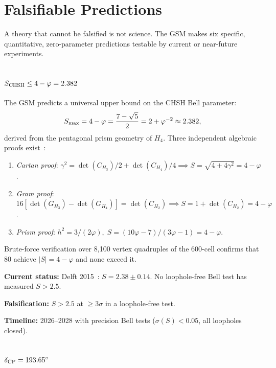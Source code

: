 \documentclass[aps,prd,twocolumn,superscriptaddress,nofootinbib,showpacs]{revtex4-2}
\begin{document}
\section{Falsifiable Predictions}\label{sec:predictions}

A theory that cannot be falsified is not science.  The GSM makes six
specific, quantitative, zero-parameter predictions testable by
current or near-future experiments.

\subsection{$S_{\rm CHSH} \leq 4 - \varphi = 2.382$}
\label{sec:bell}

The GSM predicts a universal upper bound on the CHSH Bell parameter:
\begin{equation}
S_{\rm max} = 4 - \varphi = \frac{7 - \sqrt{5}}{2} = 2 + \varphi^{-2}
\approx 2.382,
\label{eq:chsh}
\end{equation}
derived from the pentagonal prism geometry of $H_4$.  Three
independent algebraic proofs exist~\cite{GSMrepo}:
\begin{enumerate}
\item \emph{Cartan proof}: $\gamma^2 = \det(C_{H_3})/2 +
\det(C_{H_4})/4 \implies S = \sqrt{4 + 4\gamma^2} = 4 - \varphi$.
\item \emph{Gram proof}: $16[\det(G_{H_3}) - \det(G_{H_4})] =
\det(C_{H_2}) \implies S = 1 + \det(C_{H_2}) = 4 - \varphi$.
\item \emph{Prism proof}: $h^2 = 3/(2\varphi),\; S = (10\varphi -
7)/(3\varphi - 1) = 4 - \varphi$.
\end{enumerate}
Brute-force verification over 8{,}100 vertex quadruples of the
600-cell confirms that 80 achieve $|S| = 4 - \varphi$ and none
exceed it.

\textbf{Current status:} Delft 2015~\cite{Hensen2015}: $S = 2.38 \pm
0.14$.  No loophole-free Bell test has measured $S > 2.5$.

\textbf{Falsification:} $S > 2.5$ at $\geq 3\sigma$ in a
loophole-free test.

\textbf{Timeline:} 2026--2028 with precision Bell tests ($\sigma(S) <
0.05$, all loopholes closed).

\subsection{$\delta_{\rm CP} = 193.65^\circ$}\label{sec:deltacp}
\end{document}
